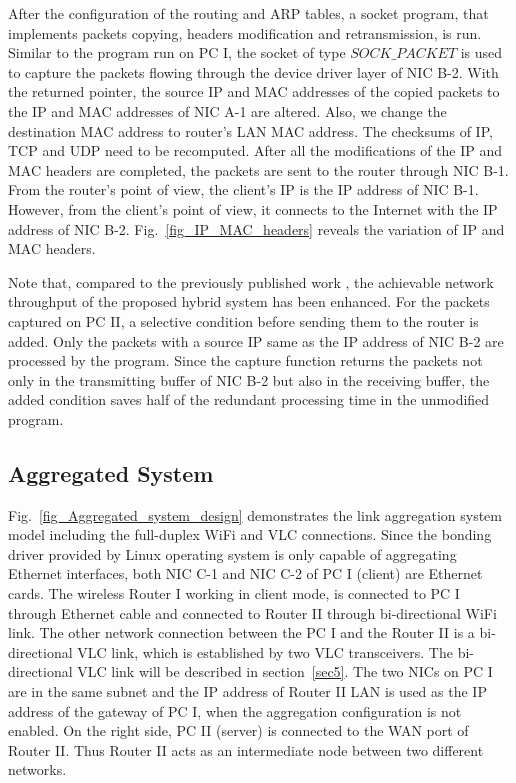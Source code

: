 \documentclass[10pt,journal]{IEEEtran}
\begin{document}
After the configuration of the routing and ARP tables, a socket program, that implements packets copying, headers modification and retransmission, is run. Similar to the program run on PC I, the socket of type $SOCK\_PACKET$ is used to capture the packets flowing through the device driver layer of NIC B-2. With the returned pointer, the source IP and MAC addresses of the copied packets to the IP and MAC addresses of NIC A-1 are altered. Also, we change the destination MAC address to router's LAN MAC address. The checksums of IP, TCP and UDP need to be recomputed. After all the modifications of the IP and MAC headers are completed, the packets are sent to the router through NIC B-1. From the router's point of view, the client's IP is the IP address of NIC B-1. However, from the client's point of view, it connects to the Internet with the IP address of NIC B-2. Fig.~\ref{fig_IP_MAC_headers} reveals the variation of IP and MAC headers.

Note that, compared to the previously published work \cite{shaoindoor}, the achievable network throughput of the proposed hybrid system has been enhanced. For the packets captured on PC II, a selective condition before sending them to the router is added. Only the packets with a source IP same as the IP address of NIC B-2 are processed by the program. Since the capture function returns the packets not only in the transmitting buffer of NIC B-2 but also in the receiving buffer, the added condition saves half of the redundant processing time in the unmodified program.

\subsection{Aggregated System}
Fig.~\ref{fig_Aggregated_system_design} demonstrates the link aggregation system model including the full-duplex WiFi and VLC connections. Since the bonding driver provided by Linux operating system is only capable of aggregating Ethernet interfaces, both NIC C-1 and NIC C-2 of PC I (client) are Ethernet cards. The wireless Router I working in client mode, is connected to PC I through Ethernet cable and connected to Router II through bi-directional WiFi link. The other network connection between the PC I and the Router II is a bi-directional VLC link, which is established by two VLC transceivers. The bi-directional VLC link will be described in section~\ref{sec5}. The two NICs on PC I are in the same subnet and the IP address of Router II LAN is used as the IP address of the gateway of PC I, when the aggregation configuration is not enabled. On the right side, PC II (server) is connected to the WAN port of Router II. Thus Router II acts as an intermediate node between two different networks.
\end{document}
